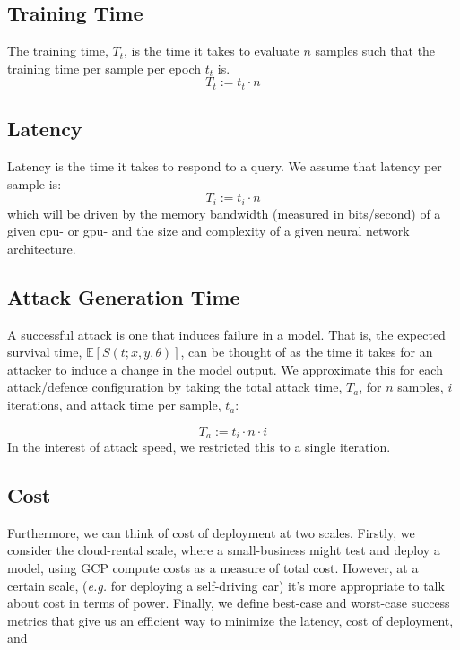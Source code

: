 \documentclass[conference]{IEEEtran}
\begin{document}



\subsection{Training Time}
The training time, $T_t$, is the time it takes to evaluate $n$ samples such that the training time per sample per epoch $t_t$ is.
$$
T_t := t_t\cdot n
$$

\subsection{Latency}
Latency is the time it takes to respond to a query. We assume that latency per sample is:
$$
T_i  := t_i \cdot n
$$
which will be driven by the memory bandwidth (measured in bits/second) of a given cpu- or gpu- and the size\cite{vgg} and complexity\cite{resnet} of a given neural network architecture.

\subsection{Attack Generation Time}
A successful attack is one that induces failure in a model. That is, the expected survival time, $\mathbb{E}[S(t;x,y,\theta)]$, can be thought of as the time it takes for an attacker to induce a change in the model output. We approximate this for each attack/defence configuration by taking the total attack time, $T_a$, for $n$ samples, $i$ iterations, and attack time per sample, $t_a$:

$$
T_a := t_i \cdot n \cdot i 
$$
In the interest of attack speed, we restricted this to a single iteration.

\subsection{Cost}
Furthermore, we can think of cost of deployment at two scales. Firstly, we consider the cloud-rental scale, where a small-business might test and deploy a model, using GCP compute costs as a measure of total cost. However, at a certain scale, (\textit{e.g.} for deploying a self-driving car) it's more appropriate to talk about cost in terms of power. Finally, we define best-case and worst-case success metrics that give us an efficient way to minimize the latency, cost of deployment, and 
\end{document}
